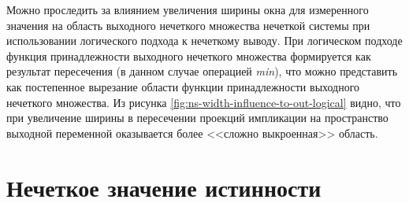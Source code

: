 Можно проследить за влиянием увеличения ширины окна для измеренного значения на область выходного нечеткого множества нечеткой системы при использовании логического подхода к нечеткому выводу. При логическом подходе функция принадлежности выходного нечеткого множества формируется как результат пересечения (в данном случае операцией \textit{min}), что можно представить как постепенное вырезание области функции принадлежности выходного нечеткого множества. Из рисунка \cref{fig:ns-width-influence-to-out-logical} видно, что при увеличение ширины в пересечении проекций импликации на пространство выходной переменной оказывается более <<сложно выкроенная>> область.


\section{Нечеткое значение истинности}



